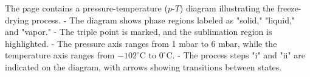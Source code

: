 The page contains a pressure-temperature (\(p\)-\(T\)) diagram illustrating the freeze-drying process.  
- The diagram shows phase regions labeled as "solid," "liquid," and "vapor."  
- The triple point is marked, and the sublimation region is highlighted.  
- The pressure axis ranges from 1 mbar to 6 mbar, while the temperature axis ranges from \(-102^\circ\text{C}\) to \(0^\circ\text{C}\).  
- The process steps "i" and "ii" are indicated on the diagram, with arrows showing transitions between states.